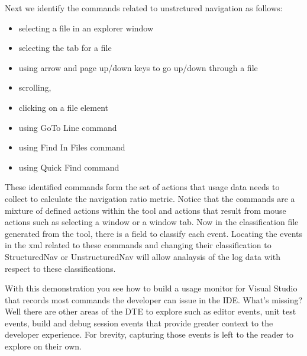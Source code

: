 Next we identify the commands related to unstrctured navigation as follows:
\begin{itemize}
\item selecting a file in an explorer window
\item selecting the tab for a file
\item using arrow and page up/down keys to go up/down through a file
\item scrolling,
\item clicking on a file element
\item using GoTo Line command
\item using Find In Files command
\item using Quick Find command
\end{itemize}

These identified commands form the set of actions that usage data needs to collect to calculate the navigation ratio metric.  Notice that the commands are a mixture of defined actions within the tool and actions that result from mouse actions such as selecting a window or a window tab.  Now in the classification file generated from the tool, there is a field to classify each event.  Locating the events in the xml related to these commands and changing their classification to StructuredNav or UnstructuredNav will allow analaysis of the log data with respect to these classifications.

With this demonstration you see how to build a usage monitor for Visual Studio that records most commands the developer can issue in the IDE.  What's missing?  Well there are other areas of the DTE to explore such as editor events, unit test events, build and debug session events that provide greater context to the developer experience.  For brevity, capturing those events is left to the reader to explore on their own.




